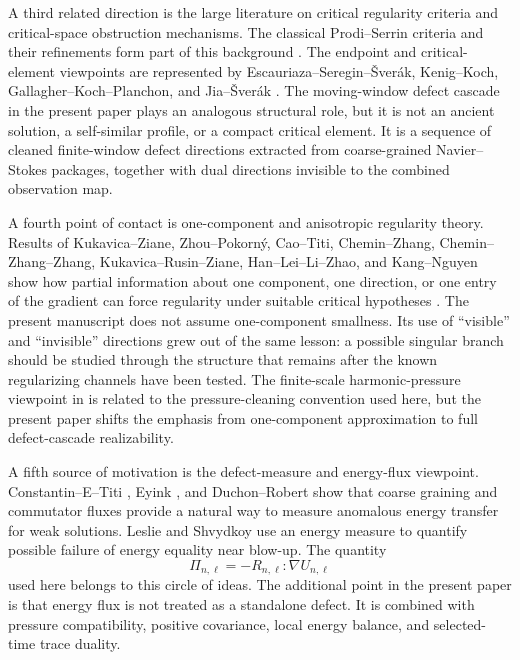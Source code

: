 \documentclass[11pt]{article}
\numberwithin{equation}{section}
\theoremstyle{plain}
\theoremstyle{definition}
\theoremstyle{remark}
\begin{document}
A third related direction is the large literature on critical regularity criteria and critical-space obstruction mechanisms.  The classical Prodi--Serrin criteria and their refinements form part of this background \cite{Prodi1959,Serrin1962,Serrin1963,KozonoSohr1997}.  The endpoint and critical-element viewpoints are represented by Escauriaza--Seregin--\v{S}ver\'ak, Kenig--Koch, Gallagher--Koch--Planchon, and Jia--\v{S}ver\'ak \cite{EscauriazaSereginSverak2003,KenigKoch2011,GallagherKochPlanchon2013,JiaSverak2014}.  The moving-window defect cascade in the present paper plays an analogous structural role, but it is not an ancient solution, a self-similar profile, or a compact critical element.  It is a sequence of cleaned finite-window defect directions extracted from coarse-grained Navier--Stokes packages, together with dual directions invisible to the combined observation map.

A fourth point of contact is one-component and anisotropic regularity theory.  Results of Kukavica--Ziane, Zhou--Pokorn\'y, Cao--Titi, Chemin--Zhang, Chemin--Zhang--Zhang, Kukavica--Rusin--Ziane, Han--Lei--Li--Zhao, and Kang--Nguyen show how partial information about one component, one direction, or one entry of the gradient can force regularity under suitable critical hypotheses \cite{KukavicaZiane2006,KukavicaZiane2007,ZhouPokorny2009,ZhouPokorny2010,CaoTiti2011,CheminZhang2016,CheminZhangZhang2017,KukavicaRusinZiane2017,HanLeiLiZhao2019,KangNguyen2023}.  The present manuscript does not assume one-component smallness.  Its use of ``visible'' and ``invisible'' directions grew out of the same lesson: a possible singular branch should be studied through the structure that remains after the known regularizing channels have been tested.  The finite-scale harmonic-pressure viewpoint in \cite{Yu2026HarmonicPressure} is related to the pressure-cleaning convention used here, but the present paper shifts the emphasis from one-component approximation to full defect-cascade realizability.

A fifth source of motivation is the defect-measure and energy-flux viewpoint.  Constantin--E--Titi \cite{ConstantinETiti1994}, Eyink \cite{Eyink1994}, and Duchon--Robert \cite{DuchonRobert2000} show that coarse graining and commutator fluxes provide a natural way to measure anomalous energy transfer for weak solutions.  Leslie and Shvydkoy \cite{LeslieShvydkoy2018} use an energy measure to quantify possible failure of energy equality near blow-up.  The quantity
\[
  \Pi_{n,\ell}=-R_{n,\ell}:\nabla U_{n,\ell}
\]
used here belongs to this circle of ideas.  The additional point in the present paper is that energy flux is not treated as a standalone defect.  It is combined with pressure compatibility, positive covariance, local energy balance, and selected-time trace duality.
\end{document}
